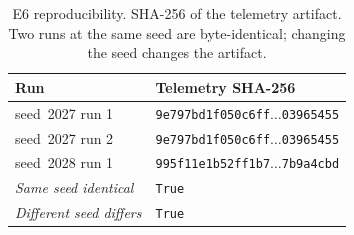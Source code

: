 \begin{table}[t]
\centering\small
\caption{E6 reproducibility. SHA-256 of the telemetry artifact. Two runs at the same seed are byte-identical; changing the seed changes the artifact.}
\label{tab:e6}
\begin{tabular}{@{}ll@{}}
\toprule
Run & Telemetry SHA-256 \\
\midrule
seed~2027 run 1 & \texttt{9e797bd1f050c6ff}$\ldots$\texttt{03965455} \\
seed~2027 run 2 & \texttt{9e797bd1f050c6ff}$\ldots$\texttt{03965455} \\
seed~2028 run 1 & \texttt{995f11e1b52ff1b7}$\ldots$\texttt{7b9a4cbd} \\
\emph{Same seed identical} & \texttt{True} \\
\emph{Different seed differs} & \texttt{True} \\
\bottomrule
\end{tabular}
\end{table}

